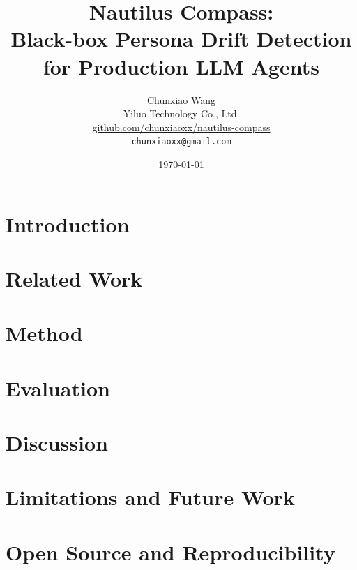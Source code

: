 \documentclass{article}
\title{Nautilus Compass:\\
       Black-box Persona Drift Detection for Production LLM Agents}
\author{Chunxiao Wang \\
        Yiluo Technology Co., Ltd. \\
        \url{github.com/chunxiaoxx/nautilus-compass} \\
        \texttt{chunxiaoxx@gmail.com}}
\date{\today}
\begin{document}
\maketitle

\begin{abstract}

\end{abstract}

\section{Introduction}


\section{Related Work}


\section{Method}


\section{Evaluation}


\section{Discussion}


\section{Limitations and Future Work}


\section{Open Source and Reproducibility}




\end{document}
